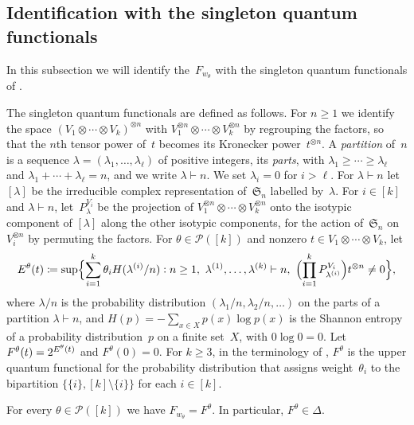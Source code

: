 \documentclass[11pt,letterpaper]{article}
\begin{document}
\subsection{Identification with the singleton quantum functionals}\label{sec:qf-identify}

In this subsection we will identify the~$F_{w_\theta}$ with the singleton quantum functionals of \cite{MR4495838}. 

The singleton quantum functionals are defined as follows. For $n \geq 1$ we identify the space $(V_1 \otimes \cdots \otimes V_k)^{\otimes n}$ with $V_1^{\otimes n} \otimes \cdots \otimes V_k^{\otimes n}$ by regrouping the factors, so that the $n$th tensor power of~$t$ becomes its Kronecker power~$t^{\otimes n}$. A \emph{partition} of~$n$ is a sequence $\lambda = (\lambda_1, \ldots, \lambda_\ell)$ of positive integers, its \emph{parts}, with $\lambda_1 \geq \cdots \geq \lambda_\ell$ and $\lambda_1 + \cdots + \lambda_\ell = n$, and we write $\lambda \vdash n$. We set $\lambda_i = 0$ for $i > \ell$. For $\lambda \vdash n$ let $[\lambda]$ be the irreducible complex representation of~$\mathfrak{S}_n$ labelled by~$\lambda$. For $i \in [k]$ and $\lambda \vdash n$, let~$P^{V_i}_\lambda$ be the projection of $V_1^{\otimes n} \otimes \cdots \otimes V_k^{\otimes n}$ onto the isotypic component of $[\lambda]$ along the other isotypic components, for the action of~$\mathfrak{S}_n$ on $V_i^{\otimes n}$ by permuting the factors. For $\theta \in \mathcal{P}([k])$ and nonzero $t \in V_1 \otimes \cdots \otimes V_k$, let
\[
E^\theta(t) \coloneqq \sup \Bigl\{ \sum_{i=1}^k \theta_i H(\lambda^{(i)}/n) : n \geq 1,\ \lambda^{(1)}, \ldots, \lambda^{(k)} \vdash n,\ \Bigl(\prod_{i=1}^k P^{V_i}_{\lambda^{(i)}}\Bigr) t^{\otimes n} \neq 0 \Bigr\},
\]
where $\lambda/n$ is the probability distribution $(\lambda_1/n, \lambda_2/n, \ldots)$ on the parts of a partition $\lambda \vdash n$, and $H(p) = -\sum_{x \in X} p(x) \log p(x)$ is the Shannon entropy of a probability distribution~$p$ on a finite set~$X$, with $0 \log 0 = 0$. Let $F^\theta(t) = 2^{\smash{E^\theta(t)}}$ and $F^\theta(0) = 0$. For $k \geq 3$, in the terminology of \cite{MR4495838}, $F^\theta$ is the upper quantum functional \cite[Definition~3.14]{MR4495838} for the probability distribution that assigns weight~$\theta_i$ to the bipartition $\{\{i\}, [k] \setminus \{i\}\}$ for each $i \in [k]$. 

\begin{theorem}\label{th:cvz}
For every $\theta \in \mathcal{P}([k])$ we have $F_{w_\theta} = F^\theta$. In particular, $F^\theta \in \Delta$.
\end{theorem}
\end{document}
